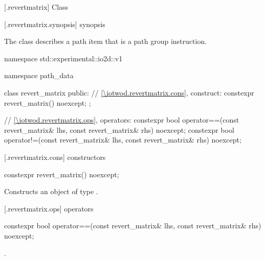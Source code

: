  [\iotwod.revertmatrix] {Class }

 [\iotwod.revertmatrix.synopsis] { synopsis}

\pnum
{}%
The class  describes a path item that is a path group instruction.

\begin{codeblock}
namespace std::experimental::io2d::v1 {
  namespace path_data {
    class revert_matrix {
    public:
      // \ref{\iotwod.revertmatrix.cons}, construct:
      constexpr revert_matrix() noexcept;
    };
    
    // \ref{\iotwod.revertmatrix.ops}, operators:
    constexpr bool operator==(const revert_matrix& lhs,
      const revert_matrix& rhs) noexcept;
    constexpr bool operator!=(const revert_matrix& lhs,
      const revert_matrix& rhs) noexcept;
  }
}
\end{codeblock}

 [\iotwod.revertmatrix.cons] { constructors}

%
\begin{itemdecl}
constexpr revert_matrix() noexcept;
\end{itemdecl}
\begin{itemdescr}
\pnum
\effects
Constructs an object of type .
\end{itemdescr}

 [\iotwod.revertmatrix.ops]{ operators}

%
\begin{itemdecl}
constexpr bool operator==(const revert_matrix& lhs, const revert_matrix& rhs) 
  noexcept;
\end{itemdecl}
\begin{itemdescr}
\pnum
\returns
{}.
\end{itemdescr}
